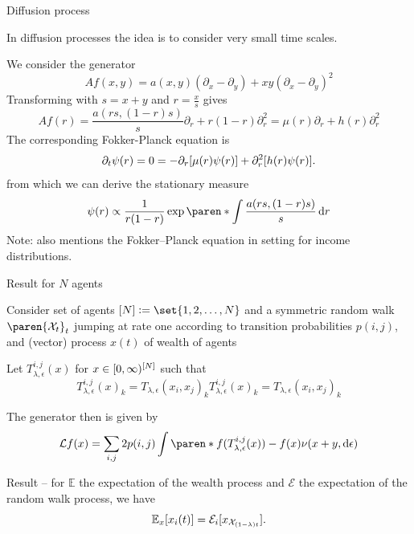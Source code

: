 \documentclass[9pt]{beamer}
\begin{document}
\begin{frame}{Diffusion process}

In diffusion processes the idea is to consider very small time scales.

We consider the generator
\[
Af(x, y) = a(x, y)(\partial_x - \partial_y) + xy (\partial_x - \partial_y)^2
\]
Transforming with $s = x+y$ and $r = \frac{x}{s}$ gives
\[
Af(r)
= \frac{a(rs, (1-r)s)}{s}\partial_r + r(1-r) \partial_r^2
= \mu(r)\partial_r + h(r) \partial_r^2
\]
\pause
The corresponding Fokker-Planck equation is
\[
\partial_t \psi(r) = 0 =
- \partial_r[\mu(r) \psi(r)] + \partial_r^2[h(r) \psi(r)].
\]
\pause
from which we can derive the stationary measure
\[
\psi(r) \propto \frac{1}{r(1-r)}\exp\paren*{\int\frac{a(rs, (1-r)s)}{s} \diff r} %
\]
Note:  also mentions the Fokker--Planck equation in setting for income distributions.
\end{frame}




\begin{frame}{Result for $N$ agents}

Consider set of agents $\brackets{N} \defeq \set{1, 2, \hdots, N}$ and a symmetric random walk $\paren{\mathcal{X}_t}_t$ jumping at rate one according to transition probabilities $p(i,j)$, and (vector) process $x(t)$ of wealth of agents

\pause

Let $T_{\lambda, \epsilon}^{i, j}(x)$ for $x \in [0, \infty)^{[N]}$ such that
\[
T_{\lambda, \epsilon}^{i, j}(x)_k = T_{\lambda, \epsilon}(x_i, x_j)_k
T_{\lambda, \epsilon}^{i, j}(x)_k = T_{\lambda, \epsilon}(x_i, x_j)_k
\]

\pause

The generator then is given by
\[
\mathcal{L}f(x) = \sum_{i, j} 2 p(i, j) \int \paren*{f(T_{\lambda, \epsilon}^{i, j}(x)) - f(x)} \nu(x+y, \diff \epsilon)
\]

\pause

Result -- for $\mathbb{E}$ the expectation of the wealth process and $\mathcal{E}$ the expectation of the random walk process, we have
\[
\mathbb{E}_x[x_i(t)] = \mathcal{E}_i[x_{\mathcal{X}_{(1-\lambda)t}}].
\]
\end{frame}
\end{document}
